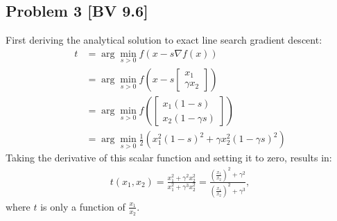 \documentclass[12pt, letterpaper, twoside]{article}
\begin{document}
\subsection*{Problem 3 \small[BV 9.6]}
First deriving the analytical solution to exact line search gradient descent:
\begin{align*}
    t&=\arg\min_{s>0} f(x-s\nabla f(x))\\
    &=\arg\min_{s>0} f(x-s\left[
             \begin{array}{c}
                  x_1\\
                  \gamma x_2
             \end{array}
             \right])\\
    &=\arg\min_{s>0} f(\left[
             \begin{array}{c}
                  x_1(1-s)\\
                  x_2(1-\gamma s)
             \end{array}
             \right])\\
    &=\arg\min_{s>0} \frac{1}{2}(x_1^2(1-s)^2+\gamma x_2^2(1-\gamma s)^2)
\end{align*}
Taking the derivative of this scalar function and setting it to zero, results in:
\begin{align*}
    t(x_1, x_2) =\frac{x_1^2+\gamma^2x_2^2}{x_1^2+\gamma^3x_2^2}=\frac{(\frac{x_1}{x_2})^2+\gamma^2}{(\frac{x_1}{x_2})^2+\gamma^3},
\end{align*}
where $t$ is only a function of $\frac{x_1}{x_2}$.
\end{document}
